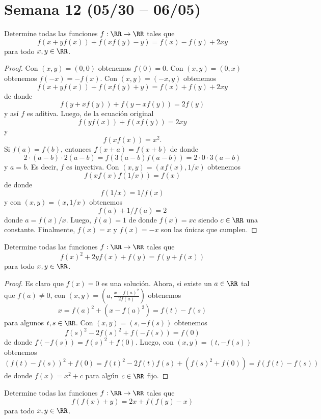 \section{Semana 12 (05/30 -- 06/05)}


\begin{probMG}
	Determine todas las funciones $f:\RR\to\RR$ tales que
	\[f(x+yf(x))+f(xf(y)-y)=f(x)-f(y)+2xy\]
	para todo $x,y\in\RR$.
\end{probMG}

\begin{proof}
	Con $(x,y)=(0,0)$ obtenemos $f(0)=0$. Con $(x,y)=(0,x)$ obtenemos $f(-x)=-f(x)$. Con $(x,y)=(-x,y)$ obtenemos
	\[f(x+yf(x))+f(xf(y)+y)=f(x)+f(y)+2xy\]
	de donde
	\[f(y+xf(y))+f(y-xf(y))=2f(y)\]
	y así $f$ es aditiva. Luego, de la ecuación original
	\[f(yf(x))+f(xf(y))=2xy\]
	y
	\[f(xf(x))=x^2.\]
	Si $f(a)=f(b)$, entonces $f(x+a)=f(x+b)$ de donde
	\[2\cdot(a-b)\cdot 2(a-b)=f(3(a-b)f(a-b))=2\cdot 0\cdot 3(a-b)\]
	y $a=b$. Es decir, $f$ es inyectiva. Con $(x,y)=(xf(x),1/x)$ obtenemos
	\[f(xf(x)f(1/x))=f(x)\]
	de donde
	\[f(1/x)=1/f(x)\]
	y con $(x,y)=(x,1/x)$ obtenemos
	\[f(a)+1/f(a)=2\]
	donde $a=f(x)/x$. Luego, $f(a)=1$ de donde $f(x)=xc$ siendo $c\in\RR$ una constante. Finalmente, $f(x)=x$ y $f(x)=-x$ son las únicas que cumplen.
\end{proof}

\begin{probEG}
	Determine todas las funciones $f:\RR\to\RR$ tales que
	\[f(x)^2+2yf(x)+f(y)=f(y+f(x))\]
	para todo $x,y\in\RR$.
\end{probEG}

\begin{proof}
	Es claro que $f(x)=0$ es una solución. Ahora, si existe un $a\in\RR$ tal que $f(a)\ne 0$, con $(x,y)=\left(a,\frac{x-f(a)^2}{2f(a)}\right)$ obtenemos
	\[x=f(a)^2+(x-f(a)^2)=f(t)-f(s)\]
	para algunos $t,s\in\RR$. Con $(x,y)=(s,-f(s))$ obtenemos
	\[f(s)^2-2f(s)^2+f(-f(s))=f(0)\]
	de donde $f(-f(s))=f(s)^2+f(0)$. Luego, con $(x,y)=(t,-f(s))$ obtenemos
	\[(f(t)-f(s))^2+f(0)=f(t)^2-2f(t)f(s)+(f(s)^2+f(0))=f(f(t)-f(s))\]
	de donde $f(x)=x^2+c$ para algún $c\in\RR$ fijo.
\end{proof}

\begin{probMB}
	Determine todas las funciones $f:\RR\to\RR$ tales que
	\[f(f(x)+y)=2x+f(f(y)-x)\]
	para todo $x,y\in\RR$.
\end{probMB}

